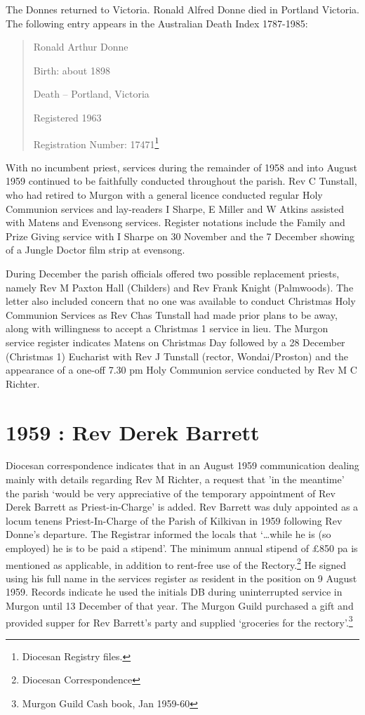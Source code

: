 The Donnes returned to Victoria. Ronald Alfred Donne died in Portland
Victoria. The following entry appears in the Australian Death Index
1787-1985:

\begin{quote}
Ronald Arthur Donne

Birth: about 1898

Death -- Portland, Victoria

Registered 1963

Registration Number: 17471\footnote{Diocesan Registry files.}
\end{quote}

With no incumbent priest, services during the remainder of 1958 and into
August 1959 continued to be faithfully conducted throughout the parish.
Rev C Tunstall, who had retired to Murgon with a general licence
conducted regular Holy Communion services and lay-readers I Sharpe, E
Miller and W Atkins assisted with Matens and Evensong services. Register
notations include the Family and Prize Giving service with I Sharpe on
30 November and the 7 December showing of a Jungle Doctor film strip at
evensong.

During December the parish officials offered two possible replacement
priests, namely Rev M Paxton Hall (Childers) and Rev Frank Knight
(Palmwoods). The letter also included concern that no one was available
to conduct Christmas Holy Communion Services as Rev Chas Tunstall had
made prior plans to be away, along with willingness to accept a
Christmas 1 service in lieu. The Murgon service register indicates
Matens on Christmas Day followed by a 28 December (Christmas 1)
Eucharist with Rev J Tunstall (rector, Wondai/Proston) and the
appearance of a one-off 7.30 pm Holy Communion service conducted by Rev
M C Richter.

\section{1959 : Rev Derek Barrett}

Diocesan correspondence indicates that in an August 1959 communication
dealing mainly with details regarding Rev M Richter, a request that 'in
the meantime' the parish `would be very appreciative of the temporary
appointment of Rev Derek Barrett as Priest-in-Charge' is added. Rev
Barrett was duly appointed as a locum tenens Priest-In-Charge of the
Parish of Kilkivan in 1959 following Rev Donne's departure. The
Registrar informed the locals that `\ldots while he is (so employed) he
is to be paid a stipend'. The minimum annual stipend of \pounds850 pa is
mentioned as applicable, in addition to rent-free use of the
Rectory.\footnote{Diocesan Correspondence} He signed using his full name
in the services register as resident in the position on 9 August 1959.
Records indicate he used the initials DB during uninterrupted service in
Murgon until 13 December of that year. The Murgon Guild purchased a gift
and provided supper for Rev Barrett's party and supplied `groceries for
the rectory'.\footnote{Murgon Guild Cash book, Jan 1959-60}

